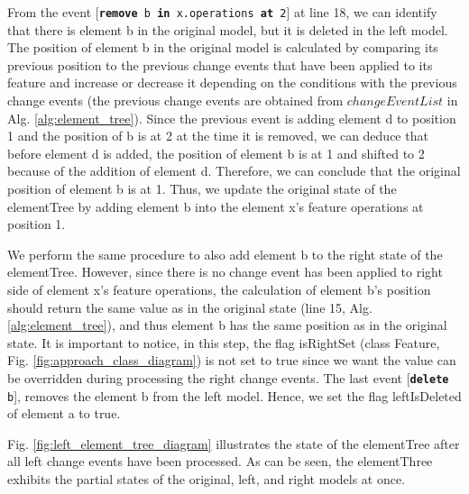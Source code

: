 \documentclass{jot}
\begin{document}
From the event [\texttt{\small \textbf{remove} b \textbf{in} x.operations \textbf{at} 2}] at line 18, we can identify that there is element \textsf{b} in the original model, but it is deleted in the left model. The position of element \textsf{b} in the original model is calculated by comparing its previous position to the previous change events that have been applied to its feature and increase or decrease it depending on the conditions with the previous change events (the previous change events are obtained from $changeEventList$ in Alg. \ref{alg:element_tree}). Since the previous event is adding element \textsf{d} to position 1 and the position of \textsf{b} is at 2 at the time it is removed, we can deduce that before element \textsf{d} is added, the position of element \textsf{b} is at 1 and shifted to 2 because of the addition of element \textsf{d}.  Therefore, we can conclude that the original position of element \textsf{b} is at 1. Thus, we update the original state of the \textsf{elementTree} by adding element \textsf{b} into the element \textsf{x}'s feature \textsf{operations} at position 1.  

We perform the same procedure to also add element \textsf{b} to the right state of the \textsf{elementTree}. However, since there is no change event has been applied to right side of element \textsf{x}'s feature \textsf{operations}, the calculation of element \textsf{b}'s position should return the same value as in the original state (line 15, Alg. \ref{alg:element_tree}), and thus element \textsf{b} has the same position as in the original state. It is important to notice, in this step, the flag \textsf{isRightSet} (class \textsf{Feature}, Fig. \ref{fig:approach_class_diagram}) is not set to \textsf{true} since we want the value can be overridden during processing the right change events. The last event [\texttt{\small \textbf{delete} b}], removes the element \textsf{b} from the left model. Hence, we set the flag \textsf{leftIsDeleted} of element \textsf{a} to \textsf{true}.

Fig. \ref{fig:left_element_tree_diagram} illustrates the state of the \textsf{elementTree} after all left change events have been processed. As can be seen, the \textsf{elementThree} exhibits the partial states of the original, left, and right models at once. 
\end{document}
